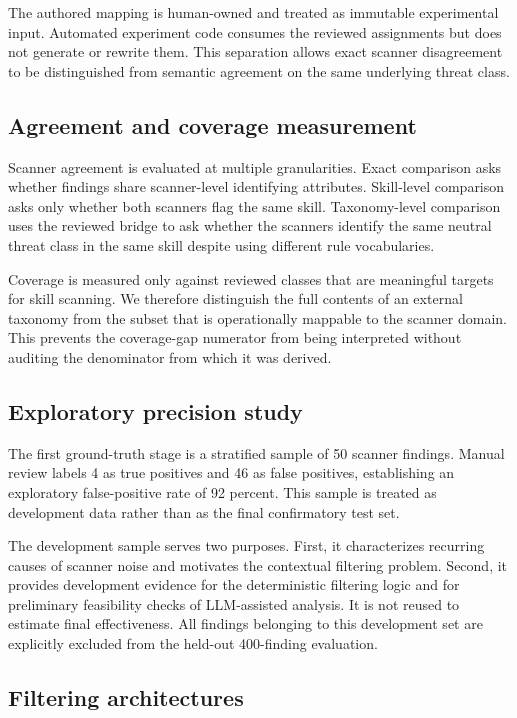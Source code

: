 \documentclass[conference]{IEEEtran}
\begin{document}
The authored mapping is human-owned and treated as immutable experimental input. Automated experiment code consumes the reviewed assignments but does not generate or rewrite them. This separation allows exact scanner disagreement to be distinguished from semantic agreement on the same underlying threat class.

\subsection{Agreement and coverage measurement}

Scanner agreement is evaluated at multiple granularities. Exact comparison asks whether findings share scanner-level identifying attributes. Skill-level comparison asks only whether both scanners flag the same skill. Taxonomy-level comparison uses the reviewed bridge to ask whether the scanners identify the same neutral threat class in the same skill despite using different rule vocabularies.

Coverage is measured only against reviewed classes that are meaningful targets for skill scanning. We therefore distinguish the full contents of an external taxonomy from the subset that is operationally mappable to the scanner domain. This prevents the coverage-gap numerator from being interpreted without auditing the denominator from which it was derived.

\subsection{Exploratory precision study}

The first ground-truth stage is a stratified sample of 50 scanner findings. Manual review labels 4 as true positives and 46 as false positives, establishing an exploratory false-positive rate of 92 percent. This sample is treated as development data rather than as the final confirmatory test set.

The development sample serves two purposes. First, it characterizes recurring causes of scanner noise and motivates the contextual filtering problem. Second, it provides development evidence for the deterministic filtering logic and for preliminary feasibility checks of LLM-assisted analysis. It is not reused to estimate final effectiveness. All findings belonging to this development set are explicitly excluded from the held-out 400-finding evaluation.

\subsection{Filtering architectures}
\end{document}
